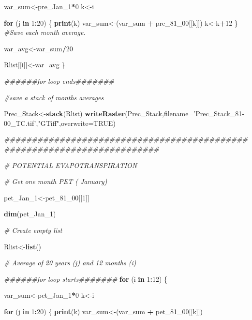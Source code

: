 \documentclass[
  10pt,
  b5paper,
]{book}
\newenvironment{Shaded}{\begin{snugshade}}{\end{snugshade}}
\newcommand{\CommentTok}[1]{\textcolor[rgb]{0.56,0.35,0.01}{\textit{#1}}}
\newcommand{\ControlFlowTok}[1]{\textcolor[rgb]{0.13,0.29,0.53}{\textbf{#1}}}
\newcommand{\DataTypeTok}[1]{\textcolor[rgb]{0.13,0.29,0.53}{#1}}
\newcommand{\DecValTok}[1]{\textcolor[rgb]{0.00,0.00,0.81}{#1}}
\newcommand{\KeywordTok}[1]{\textcolor[rgb]{0.13,0.29,0.53}{\textbf{#1}}}
\newcommand{\NormalTok}[1]{#1}
\newcommand{\OperatorTok}[1]{\textcolor[rgb]{0.81,0.36,0.00}{\textbf{#1}}}
\newcommand{\OtherTok}[1]{\textcolor[rgb]{0.56,0.35,0.01}{#1}}
\newcommand{\StringTok}[1]{\textcolor[rgb]{0.31,0.60,0.02}{#1}}
\begin{document}
\begin{Shaded}
\begin{Highlighting}[]
\NormalTok{var_sum<-pre_Jan_}\DecValTok{1}\OperatorTok{*}\DecValTok{0}
\NormalTok{k<-i}

\ControlFlowTok{for}\NormalTok{ (j }\ControlFlowTok{in} \DecValTok{1}\OperatorTok{:}\DecValTok{20}\NormalTok{) \{}
\KeywordTok{print}\NormalTok{(k)}
\NormalTok{var_sum<-(var_sum }\OperatorTok{+}\StringTok{ }\NormalTok{pre_}\DecValTok{81}\NormalTok{_}\DecValTok{00}\NormalTok{[[k]])}
\NormalTok{k<-k}\OperatorTok{+}\DecValTok{12}
\NormalTok{\}}
\CommentTok{#Save each month average. }

\NormalTok{var_avg<-var_sum}\OperatorTok{/}\DecValTok{20}

\NormalTok{Rlist[[i]]<-var_avg}
\NormalTok{\}}

\CommentTok{######for loop ends#######}

\CommentTok{#save a stack of months averages}

\NormalTok{Prec_Stack<-}\KeywordTok{stack}\NormalTok{(Rlist)}
\KeywordTok{writeRaster}\NormalTok{(Prec_Stack,}\DataTypeTok{filename=}\StringTok{'Prec_Stack_81-00_TC.tif'}\NormalTok{,}\StringTok{"GTiff"}\NormalTok{,}\DataTypeTok{overwrite=}\OtherTok{TRUE}\NormalTok{)}

\CommentTok{########################################################################}

\CommentTok{# POTENTIAL EVAPOTRANSPIRATION }


\CommentTok{# Get one month PET ( January)}

\NormalTok{pet_Jan_}\DecValTok{1}\NormalTok{<-pet_}\DecValTok{81}\NormalTok{_}\DecValTok{00}\NormalTok{[[}\DecValTok{1}\NormalTok{]]}

\KeywordTok{dim}\NormalTok{(pet_Jan_}\DecValTok{1}\NormalTok{)}

\CommentTok{# Create empty list}

\NormalTok{Rlist<-}\KeywordTok{list}\NormalTok{()}

\CommentTok{# Average of 20 years (j)  and 12 months (i) }

\CommentTok{######for loop starts#######}
\ControlFlowTok{for}\NormalTok{ (i }\ControlFlowTok{in} \DecValTok{1}\OperatorTok{:}\DecValTok{12}\NormalTok{) \{ }

\NormalTok{var_sum<-pet_Jan_}\DecValTok{1}\OperatorTok{*}\DecValTok{0}
\NormalTok{k<-i}

\ControlFlowTok{for}\NormalTok{ (j }\ControlFlowTok{in} \DecValTok{1}\OperatorTok{:}\DecValTok{20}\NormalTok{) \{}
\KeywordTok{print}\NormalTok{(k)}
\NormalTok{var_sum<-(var_sum }\OperatorTok{+}\StringTok{ }\NormalTok{pet_}\DecValTok{81}\NormalTok{_}\DecValTok{00}\NormalTok{[[k]])}


\end{Highlighting}
\end{Shaded}
\end{document}
